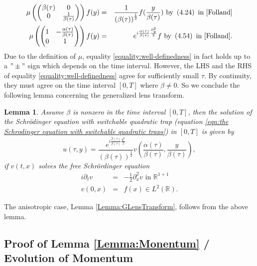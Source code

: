 \documentclass[reqno]{amsart}
\theoremstyle{plain}
\newtheorem{lemma}{Lemma}
\numberwithin{equation}{section}
\begin{document}
\begin{eqnarray*}
\mu \left( 
\begin{pmatrix}
\beta (\tau ) & 0 \\ 
0 & \frac{1}{\beta (\tau )}\end{pmatrix}\right) f(y) &=&\frac{1}{\left( \beta (\tau )\right) ^{\frac{1}{2}}}f(\frac{y}{\beta (\tau )})\text{ by }\left( 4.24\right) \text{ in \cite{Folland}} \\
\mu \left( 
\begin{pmatrix}
1 & -\frac{\alpha (\tau )}{\beta (\tau )} \\ 
0 & 1\end{pmatrix}\right) f(y) &=&e^{i\frac{\alpha (\tau )}{\beta (\tau )}\frac{\partial
_{y}^{2}}{2}}f\text{ by }\left( 4.54\right) \text{ in \cite{Folland}.}
\end{eqnarray*}Due to the definition of $\mu $, equality \ref{equality:well-definedness} in
fact holds up to a $"\pm "$ sign which depends on the time interval.
However, the LHS and the RHS of equality \ref{equality:well-definedness}
agree for sufficiently small $\tau $. By continuity, they must agree on the
time interval $\left[ 0,T\right] $ where $\beta \neq 0$. So we conclude the
following lemma concerning the generalized lens transform.

\begin{lemma}
\cite{Carles} Assume $\beta $ is nonzero in the time interval $[0,T]$, then
the solution of the Schr\"{o}dinger equation with switchable quadratic trap
(equation \ref{eqn:the Schrodinger equation with switchable quadratic traps}) in $[0,T]$ is given by\begin{equation*}
u(\tau ,y)=\frac{e^{i\frac{\dot{\beta}(\tau )}{\beta (\tau )}\frac{y^{2}}{2}}}{\left( \beta (\tau )\right) ^{\frac{1}{2}}}v(\frac{\alpha (\tau )}{\beta
(\tau )},\frac{y}{\beta (\tau )}),
\end{equation*}if $v(t,x)$ solves the free Schr\"{o}rdinger equation\begin{eqnarray*}
i\partial _{t}v &=&-\frac{1}{2}\partial _{x}^{2}v\text{ in }\mathbb{R}^{1+1}
\\
v(0,x) &=&f(x)\in L^{2}(\mathbb{R}).
\end{eqnarray*}
\end{lemma}

The anisotropic case, Lemma \ref{Lemma:GLensTransform}, follows from the
above lemma.

\subsection{Proof of Lemma \protect\ref{Lemma:Monentum} / Evolution of
Momentum}
\end{document}
